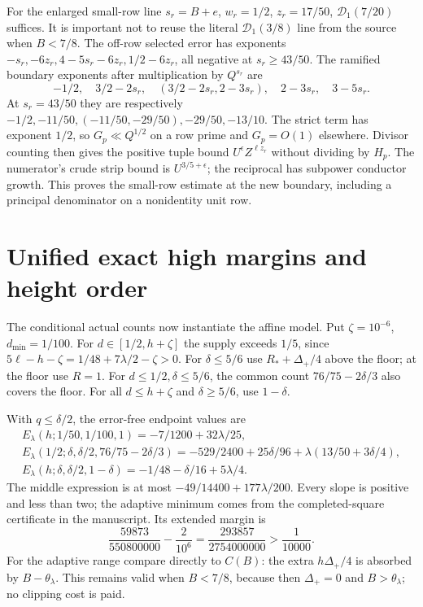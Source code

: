\documentclass[12pt]{article}
\begin{document}
For the enlarged small-row line \(s_r=B+e\), \(w_r=1/2\),
\(z_r=17/50\), \(\mathcal D_1(7/20)\) suffices.
It is important not to reuse the literal \(\mathcal D_1(3/8)\)
line from the source when \(B<7/8\).
The off-row selected error has exponents
\(-s_r,-6z_r,4-5s_r-6z_r,1/2-6z_r\), all negative at
\(s_r\ge43/50\).
The ramified boundary exponents after multiplication by \(Q^{s_r}\)
are
\[
 -1/2,\quad3/2-2s_r,\quad
 (3/2-2s_r,2-3s_r),\quad2-3s_r,\quad3-5s_r.
\]
At \(s_r=43/50\) they are respectively
\(-1/2,-11/50,(-11/50,-29/50),-29/50,-13/10\).
The strict term has exponent \(1/2\), so \(G_p\ll Q^{1/2}\)
on a row prime and \(G_p=O(1)\) elsewhere.  Divisor counting
then gives the positive tuple bound \(U^\epsilon Z^{\ell z_r}\)
without dividing by \(H_p\).
The numerator's crude strip bound is \(U^{3/5+\epsilon}\);
the reciprocal has subpower conductor growth.
This proves the small-row estimate at the new boundary, including
a principal denominator on a nonidentity unit row.

\section{Unified exact high margins and height order}
The conditional actual counts now instantiate the affine model.
Put \(\zeta=10^{-6}\), \(d_{\min}=1/100\).
For \(d\in[1/2,h+\zeta]\) the supply exceeds \(1/5\),
since \(5\ell-h-\zeta=1/48+7\lambda/2-\zeta>0\).
For \(\delta\le5/6\) use \(R_*+\Delta_+/4\) above the floor;
at the floor use \(R=1\).
For \(d\le1/2,\delta\le5/6\), the common count
\(76/75-2\delta/3\) also covers the floor.
For all \(d\le h+\zeta\) and \(\delta\ge5/6\), use \(1-\delta\).

With \(q\le\delta/2\), the error-free endpoint values are
\[
\begin{gathered}
 E_\lambda(h;1/50,1/100,1)=-7/1200+32\lambda/25,\\
 E_\lambda(1/2;\delta,\delta/2,76/75-2\delta/3)
 =-529/2400+25\delta/96+\lambda(13/50+3\delta/4),\\
 E_\lambda(h;\delta,\delta/2,1-\delta)
 =-1/48-\delta/16+5\lambda/4.
\end{gathered}
\]
The middle expression is at most
\(-49/14400+177\lambda/200\).
Every slope is positive and less than two; the adaptive minimum
comes from the completed-square certificate in the manuscript.
Its extended margin is
\[
 \frac{59873}{550800000}-\frac2{10^6}
 =\frac{293857}{2754000000}>\frac1{10000}.
\]
For the adaptive range compare directly to \(C(B)\):
the extra \(h\Delta_+/4\) is absorbed by \(B-\theta_\lambda\).
This remains valid when \(B<7/8\), because then \(\Delta_+=0\)
and \(B>\theta_\lambda\); no clipping cost is paid.
\end{document}
